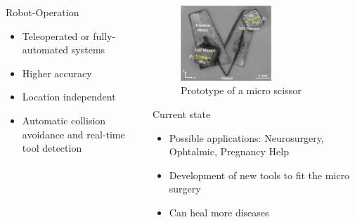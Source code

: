 \documentclass{beamer}
\begin{document}
\begin{frame}
\begin{columns}[]
\begin{column}{0.45\textwidth}
        \begin{block}{\LARGE Robot-Operation}
            \justifying  \normalsize 
            \begin{itemize}
                \item Teleoperated or fully-automated systems
                \item Higher accuracy
                \item Location independent
                \item Automatic collision avoidance \cite{collisionAvoidanceNeuro} and real-time tool detection \cite{retinal_tool_detector}
            \end{itemize}
        \end{block}

    \end{column}
    
    \begin{column}{0.45\textwidth}
        \begin{figure}
            \centering
            \includegraphics[width=0.6\textwidth]{figures/scissor_prototype.png}
            \caption{Prototype of a micro scissor \cite{ScissorActuation}}
            \label{fig:gripper_design}
        \end{figure}    
        
        \vspace*{100pt}
        
        \begin{block}{\LARGE Current state}
            \justifying \normalsize 
            \begin{itemize}
                \item Possible applications: Neurosurgery, Ophtalmic, Pregnancy Help
                \item Development of new tools to fit the micro surgery \cite{StiffnessTuning}\cite{ScissorActuation} \cite{MilliGripper}
                \item Can heal more diseases
            \end{itemize}
        \end{block}
        

\end{column}
\end{columns}
\end{frame}
\end{document}
